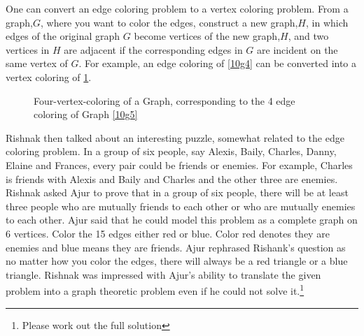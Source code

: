 One can convert an edge coloring problem to a vertex coloring problem. From a graph,$G$, where you want to color the edges, construct a new graph,$H$, in which edges of the original graph $G$ become vertices of the new graph,$H$, and two vertices in $H$ are adjacent if the corresponding edges in $G$ are incident on the same vertex of $G$.
For example, an edge coloring of \ref{10g4} can be converted into a vertex coloring of \ref{10g45}.
\begin{figure}
\begin{center}


\caption{Four-vertex-coloring of a Graph, corresponding to the 4 edge coloring of Graph \ref{10g5}}\label{10g45}
\end{center}
\end{figure}


Rishnak then talked about an interesting puzzle, somewhat related to the edge coloring problem. In a group of six people, say Alexis, Baily, Charles, Danny, Elaine and Frances, every pair could be friends or enemies. For example, Charles is friends with Alexis and Baily and Charles and the other three are enemies. Rishnak asked Ajur to prove that in a group of six people, there will be at least three people who are mutually friends to each other or who are mutually enemies to each other. Ajur said that he could model this problem as a complete graph on 6 vertices. Color the 15 edges either red or blue. Color red denotes they are enemies and blue means they are friends. Ajur rephrased Rishank's question as no matter how you color the edges, there will always be a red triangle or a blue triangle. Rishnak was impressed with Ajur's ability to translate the given problem into a graph theoretic problem even if he could not solve it.\footnote{Please work out the full solution}


